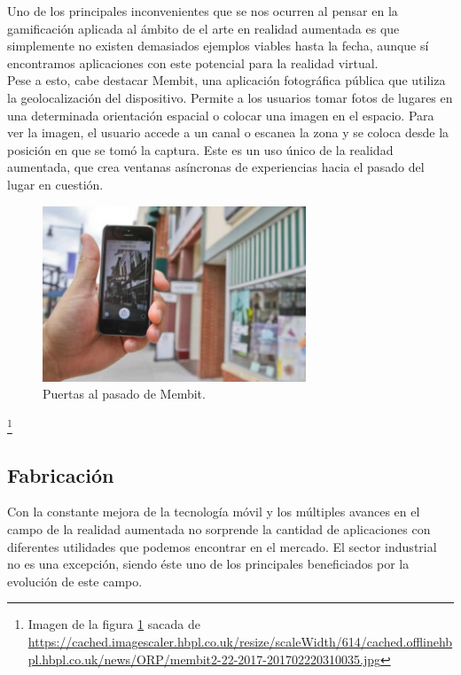 Uno de los principales inconvenientes que se nos ocurren al pensar en la gamificación aplicada al ámbito de el arte en realidad aumentada es que simplemente no existen demasiados ejemplos viables hasta la fecha, aunque sí encontramos aplicaciones con este potencial para la realidad virtual.\\

Pese a esto, cabe destacar Membit\cite{MembitYT}, una aplicación fotográfica pública que utiliza la geolocalización del dispositivo. Permite a los usuarios tomar fotos de lugares en una determinada orientación espacial o colocar una imagen en el espacio. Para ver la imagen, el usuario accede a un canal o escanea la zona y se coloca desde la posición en que se tomó la captura. Este es un uso único de la realidad aumentada, que crea ventanas asíncronas de experiencias hacia el pasado del lugar en cuestión.\cite{ARGames_Gamification}

\begin{figure}[H]
     \centering
     \includegraphics[width=0.7\textwidth]{Images/membit2-22-2017-201702220310035.jpg}
     \caption{Puertas al pasado de Membit.}
     \label{fig:Membit}
 \end{figure}
 {\let\thefootnote\relax\footnote{{Imagen de la figura \ref{fig:Membit} sacada de \url{https://cached.imagescaler.hbpl.co.uk/resize/scaleWidth/614/cached.offlinehbpl.hbpl.co.uk/news/ORP/membit2-22-2017-201702220310035.jpg}}}}

\subsection{Fabricación}
Con la constante mejora de la tecnología móvil y los múltiples avances en el campo de la realidad aumentada no sorprende la cantidad de aplicaciones con diferentes utilidades que podemos encontrar en el mercado. El sector industrial no es una excepción, siendo éste uno de los principales beneficiados por la evolución de este campo. \\

